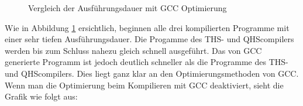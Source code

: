 \begin{figure}[H]
    \centering
    \label{fig:executespeed_optimized}
    \caption{Vergleich der Ausführungsdauer mit GCC Optimierung}
\end{figure}

Wie in Abbildung \ref{fig:executespeed_optimized} ersichtlich, beginnen alle drei kompilierten Programme mit einer sehr tiefen Ausführungsdauer.
Die Progamme des THS- und QHScompilers werden bis zum Schluss nahezu gleich schnell ausgeführt.
Das von GCC generierte Programm ist jedoch deutlich schneller als die Programme des THS- und QHScompilers.
Dies liegt ganz klar an den Optimierungsmethoden von GCC. Wenn man die Optimierung beim Kompilieren mit GCC deaktiviert, sieht die Grafik wie folgt aus:

